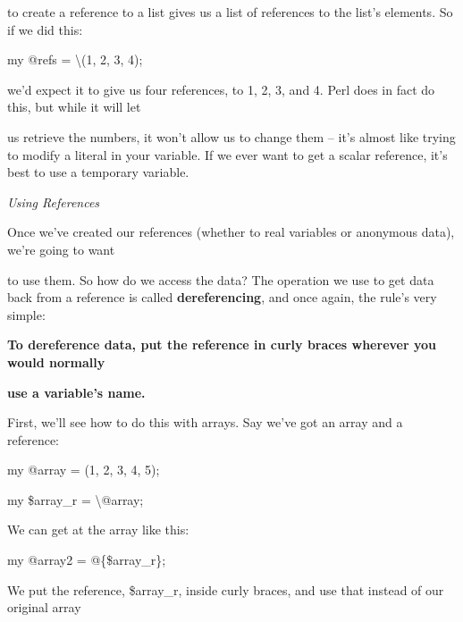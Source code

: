 \documentclass[a4paper,11pt]{book}
\begin{document}
\noindent to create a reference to a list gives us a list of references to the list's elements. So if we did this:

\noindent 

\noindent 

\noindent my @refs = \textbackslash (1, 2, 3, 4);

\noindent 

\noindent we'd expect it to give us four references, to 1, 2, 3, and 4. Perl does in fact do this, but while it will let

\noindent us  retrieve the numbers, it won't allow us to change them -- it's almost like trying to modify a literal in your variable. If we ever want to get a scalar reference, it's best to use a temporary variable.

\noindent 

\noindent 

\noindent \textit{Using References}

\noindent Once we've created our references (whether to real variables or anonymous data), we're going to want

\noindent to use them. So how do we access the data? The operation we use to get data back from a reference is called \textbf{dereferencing}, and once again, the rule's very simple:

\noindent 

\noindent 

\noindent \textbf{To dereference data, put the reference in curly braces wherever you would normally}

\noindent \textbf{use a variable's name.}

\noindent 

\noindent 

\noindent First, we'll see how to do this with arrays. Say we've got an array and a reference:

\noindent 

\noindent my @array = (1, 2, 3, 4, 5);

\noindent my \$array\_r = \textbackslash @array;

\noindent 

\noindent We can get at the array like this:

\noindent 

\noindent my @array2  = @\{\$array\_r\};

\noindent 

\noindent We put the reference,  \$array\_r,  inside  curly  braces,  and  use that  instead  of  our original  array
\end{document}
